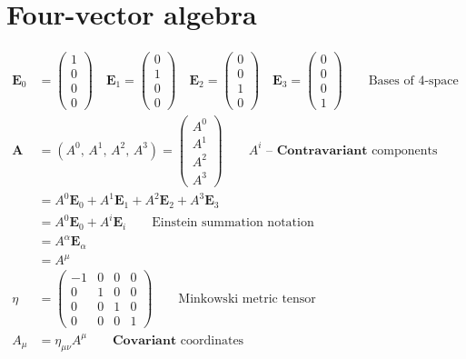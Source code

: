 \documentclass[pagesize,headsepline,10pt,parskip=half]{scrreprt}
\renewcommand{\vec}[1]{\mathbf{#1}}
\newcommand{\parray}[2]{\left(\begin{array}{#1}#2\end{array}\right)}
\begin{document}
    \section{Four-vector algebra}
      \begin{align*}
        \vec{E}_0 &= \parray{r}{1 \\ 0 \\ 0 \\ 0} \quad \vec{E}_1 = \parray{r}{0 \\ 1 \\ 0 \\ 0} \quad \vec{E}_2 = \parray{r}{0 \\ 0 \\ 1 \\ 0} \quad \vec{E}_3 = \parray{r}{0 \\ 0 \\ 0 \\ 1} \qquad \text{Bases of 4-space}\\
        \vec{A} & = \left(A^0, \, A^1, \, A^2, \, A^3\right) = \parray{c}{A^0 \\ A^1 \\ A^2 \\ A^3} \qquad A^i\text{ -- }\mathbf{Contravariant}\text{ components}\\
        & = A^0\vec{E}_0 + A^1 \vec{E}_1 + A^2 \vec{E}_2 + A^3  \vec{E}_3 \\
        & = A^0\vec{E}_0 + A^i \vec{E}_i \qquad \text{Einstein summation notation} \\
        & = A^\alpha\vec{E}_\alpha\\
        & = A^\mu \\
        \eta &= \parray{rrrr}{-1 & 0 & 0 & 0 \\ 0 & 1 & 0 & 0 \\ 0 & 0 & 1 & 0 \\ 0 & 0 & 0 & 1} \qquad \text{Minkowski metric tensor} \\
        A_\mu &= \eta_{\mu\nu} A^\mu \qquad \mathbf{Covariant}\text{ coordinates}
      \end{align*}
\end{document}
